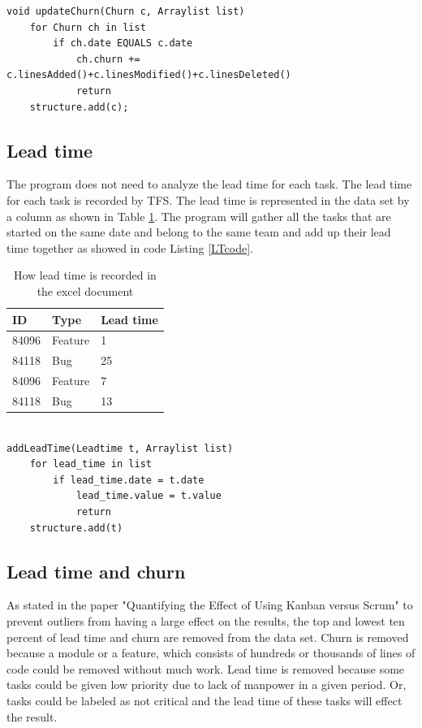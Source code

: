 \documentclass[UKenglish]{ifimaster}  %
\begin{document}
\begin{minipage}{\textwidth}
\begin{lstlisting}[caption=Pseudocode example of how throughput is measured, label=churnCode]
void updateChurn(Churn c, Arraylist list)
	for Churn ch in list
		if ch.date EQUALS c.date
			ch.churn += c.linesAdded()+c.linesModified()+c.linesDeleted()
			return
	structure.add(c);
\end{lstlisting}
 \end{minipage}
 


\subsection{Lead time}
\label{sec:LT}
The program does not need to analyze  the lead time for each task. The lead time for each task is recorded by TFS. The lead time is represented in the data set by a column as shown in Table \ref{table:LT}. The program will gather all the tasks that are started on the same date and belong to the same team and add up their lead time together as showed in code Listing \ref{LTcode}.   
\begin{table}[!ht]
\begin{center}
\begin{tabular}{ | l | l | l | }
\hline
	\bf{ID} & \bf{Type} & \bf{Lead time} \\ \hline
	84096 &  Feature  & 1 \\ \hline
	84118 &  Bug  & 25 \\ \hline
	84096 &  Feature  & 7 \\ \hline
	84118 &  Bug  & 13 \\ \hline
\end{tabular}
\caption{How lead time is recorded in the excel document}
\label{table:LT} %
\end{center}
\end{table}

\begin{minipage}{\textwidth}
\begin{lstlisting}[caption=Pseudocode example of lead time is measured, label=LTcode]

addLeadTime(Leadtime t, Arraylist list)
	for lead_time in list
		if lead_time.date = t.date
			lead_time.value = t.value
			return
	structure.add(t)
\end{lstlisting}
\end{minipage}
\subsection{Lead time and churn}
As stated in the paper "Quantifying the Effect of Using Kanban versus Scrum" \parencite{Dag} to prevent outliers from having a large effect on the results, the top and lowest ten percent of lead time and churn are removed from the data set.
Churn is removed because a module or a feature, which consists of hundreds or thousands of lines of code could be removed without much work. Lead time is removed because some tasks could be given low priority due to lack of manpower in a given period. Or, tasks could be labeled as not critical and the lead time of these tasks will effect the result.
\end{document}
